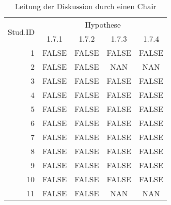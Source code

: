 \begin{table}[h!]
\caption{Leitung der Diskussion durch einen Chair}
\label{tab:7}
\begin{center}
\begin{tabular}{|r|c|c|c|c|}
\hline
\multirow{2}{2cm}{Stud.ID} & \multicolumn{4}{|c|}{Hypothese}\\
 & 1.7.1 & 1.7.2 & 1.7.3 & 1.7.4\\
\hline
1 & FALSE & FALSE & FALSE & FALSE\\
2 & FALSE & FALSE & NAN & NAN\\
3 & FALSE & FALSE & FALSE & FALSE\\
4 & FALSE & FALSE & FALSE & FALSE\\
5 & FALSE & FALSE & FALSE & FALSE\\
6 & FALSE & FALSE & FALSE & FALSE\\
7 & FALSE & FALSE & FALSE & FALSE\\
8 & FALSE & FALSE & FALSE & FALSE\\
9 & FALSE & FALSE & FALSE & FALSE\\
10 & FALSE & FALSE & FALSE & FALSE\\
11 & FALSE & FALSE & NAN & NAN\\
\hline
\end{tabular}
\end{center}
\end{table}